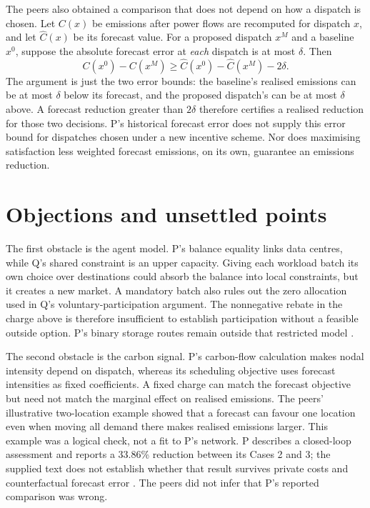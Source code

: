 \documentclass{article}
\begin{document}
The peers also obtained a comparison that does not depend on how a dispatch is chosen. Let \(C(x)\) be
emissions after power flows are recomputed for dispatch \(x\), and let \(\widehat C(x)\) be its forecast
value. For a proposed dispatch \(x^M\) and a baseline \(x^0\), suppose the absolute forecast error at
\emph{each} dispatch is at most \(\delta\). Then
\[
C(x^0)-C(x^M)
\geq \widehat C(x^0)-\widehat C(x^M)-2\delta.
\]
The argument is just the two error bounds: the baseline's realised emissions can be at most \(\delta\)
below its forecast, and the proposed dispatch's can be at most \(\delta\) above. A forecast reduction
greater than \(2\delta\) therefore certifies a realised reduction for those two decisions. P's historical
forecast error does not supply this error bound for dispatches chosen under a new incentive scheme. Nor
does maximising satisfaction less weighted forecast emissions, on its own, guarantee an emissions
reduction.

\section{Objections and unsettled points}

The first obstacle is the agent model. P's balance equality links data centres, while Q's shared
constraint is an upper capacity. Giving each workload batch its own choice over destinations could absorb
the balance into local constraints, but it creates a new market. A mandatory batch also rules out the
zero allocation used in Q's voluntary-participation argument. The nonnegative rebate in the charge above
is therefore insufficient to establish participation without a feasible outside option. P's binary
storage routes remain outside that restricted model \cite{Q,P}.

The second obstacle is the carbon signal. P's carbon-flow calculation makes nodal intensity depend on
dispatch, whereas its scheduling objective uses forecast intensities as fixed coefficients. A fixed
charge can match the forecast objective but need not match the marginal effect on realised emissions. The
peers' illustrative two-location example showed that a forecast can favour one location even when moving
all demand there makes realised emissions larger. This example was a logical check, not a fit to P's
network. P describes a closed-loop assessment and reports a 33.86\% reduction between its Cases 2 and 3;
the supplied text does not establish whether that result survives private costs and counterfactual
forecast error \cite{P}. The peers did not infer that P's reported comparison was wrong.
\end{document}
